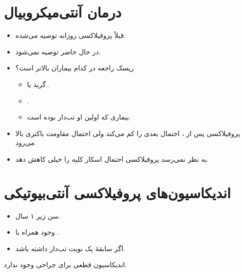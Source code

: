 \section*{درمان آنتی‌میکروبیال}
\begin{itemize}
\item قبلاً پروفیلاکسی روزانه توصیه می‌شده.
\item در حال حاضر توصیه نمی‌شود.
\item ریسک  راجعه در کدام بیماران بالاتر است؟
\begin{itemize}
\item گرید  یا .
\item {}.
\item بیماری که اولین  او تب‌دار بوده است.
\end{itemize}
\item {} پروفیلاکسی پس از ، احتمال  بعدی را کم می‌کند ولی احتمال مقاومت باکتری بالا می‌رود.
\item به نظر نمی‌رسد پروفیلاکسی احتمال اسکار کلیه را خیلی کاهش دهد.
\end{itemize}
\section*{اندیکاسیون‌های پروفیلاکسی آنتی‌بیوتیکی}
\begin{itemize}
\item سن زیر ۱ سال.
\item وجود  همراه با .
\item اگر سابقهٔ یک نوبت  تب‌دار داشته باشد.
\end{itemize}
اندیکاسیون قطعی برای جراحی وجود ندارد.
